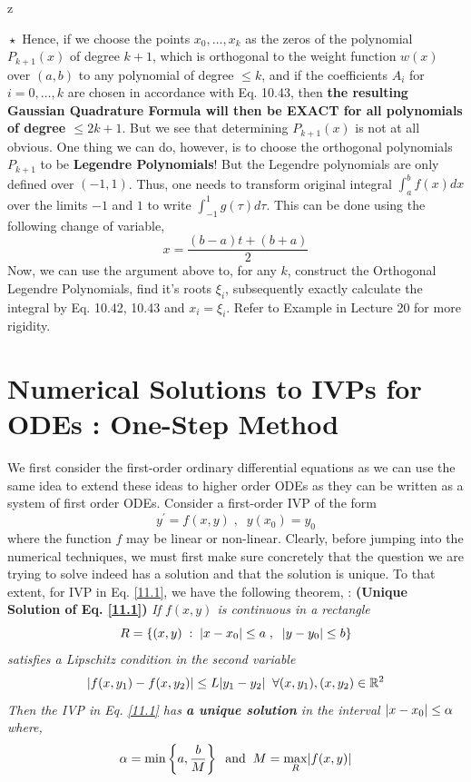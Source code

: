 z\documentclass[a4paper,12pt,twoside]{book}
\newcommand{\nll}[0]{\newline\newline}
\newcommand{\tit}[1]{\textit{#1}}
\newcommand{\theor}[1]{\boxed{\textbf{\textit{Theorem \thechapter.#1}}}}
\DeclarePairedDelimiter\abs{\lvert}{\rvert}
\renewcommand{\d}[0]{\prime}
\begin{document}
\nll
$\boxed{\star}$ Hence, if we choose the points $x_0,\dots,x_k$ as the zeros of the polynomial $P_{k+1}(x)$ of degree $k+1$, which is orthogonal to the weight function $w(x)$ over $(a,b)$ to any polynomial of degree $\le k$, and if the coefficients $A_i$ for $i=0,\dots,k$ are chosen in accordance with Eq. 10.43, then \textbf{the resulting Gaussian Quadrature Formula will then be EXACT for all polynomials of degree $\le 2k+1$}.
\nll
But we see that determining $P_{k+1}(x)$ is not at all obvious. One thing we can do, however, is to choose the orthogonal polynomials $P_{k+1}$ to be \textbf{Legendre Polynomials}! But the Legendre polynomials are only defined over $(-1,1)$. Thus, one needs to transform original integral $\int_a^bf(x)dx$ over the limits $-1$ and $1$ to write $\int_{-1}^1g(\tau) d\tau$. This can be done using the following change of variable,
\[x = \frac{(b-a)t + (b+a)}{2}\]
Now, we can use the argument above to, for any $k$, construct the Orthogonal Legendre Polynomials, find it's roots $\xi_i$, subsequently exactly calculate the integral by Eq. 10.42, 10.43 and $x_i = \xi_i$.
\nll
Refer to Example in Lecture 20 for more rigidity.
\chapter{Numerical Solutions to IVPs for ODEs : One-Step Method}
We first consider the first-order ordinary differential equations as we can use the same idea to extend these ideas to higher order ODEs as they can be written as a system of first order ODEs.
\nll
Consider a first-order IVP of the form
\begin{equation}
\label{11.1}
    y^\d = f(x,y)\;,\;\;y(x_0) = y_0
\end{equation}
where the function $f$ may be linear or non-linear.
\nll
Clearly, before jumping into the numerical techniques, we must first make sure concretely that the question we are trying to solve indeed has a solution and that the solution is unique. To that extent, for IVP in Eq. \ref{11.1}, we have the following theorem,
\nll
\theor{13} : \textbf{(Unique Solution of Eq. \ref{11.1})} \tit{If $f(x,y)$ is continuous in a rectangle
\[R = \{ (x,y) \;:\; \abs*{x-x_0} \le a\;,\;\;\abs*{y-y_0}\le b \}\]
satisfies a Lipschitz condition in the second variable
\[\abs*{f(x,y_1) - f(x,y_2)} \le L\abs*{y_1-y_2}\;\;\forall (x,y_1),(x,y_2) \in \mathbb{R}^2\]
Then the IVP in Eq. \ref{11.1} has \textbf{a unique solution} in the interval $\abs*{x-x_0}\le \alpha$ where,
\[\alpha = \min\left\{ a,\frac{b}{M} \right\} \;\;\text{and}\;\;M=\underset{R}{\max}\abs*{f(x,y)}\]
 }
\end{document}
